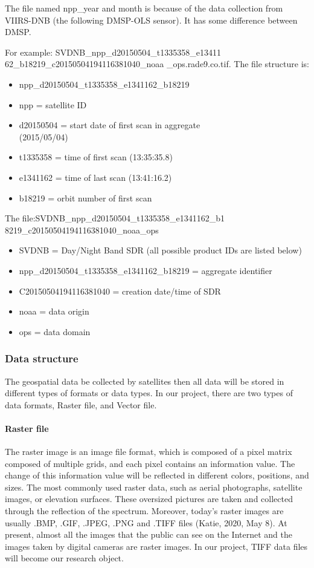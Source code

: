 \documentclass[conference]{IEEEtran}
\begin{document}
The file named npp\_year and month is because of the data collection from VIIRS-DNB (the following DMSP-OLS sensor). 
It has some difference between DMSP.

For example: SVDNB\_npp\_d20150504\_t1335358\_e13411
62\_b18219\_c20150504194116381040\_noaa
\_ops.rade9.co.tif. The file structure is:

\begin{itemize}
	\item npp\_d20150504\_t1335358\_e1341162\_b18219
	\item npp = satellite ID
	\item d20150504 = start date of first scan in aggregate \\
	(2015/05/04)
	\item t1335358 = time of first scan (13:35:35.8)
	\item e1341162 = time of last scan (13:41:16.2)
	\item b18219 = orbit number of first scan
\end{itemize} 

The file:SVDNB\_npp\_d20150504\_t1335358\_e1341162\_b1\\
8219\_c20150504194116381040\_noaa\_ops

\begin{itemize}
	\item SVDNB = Day/Night Band SDR (all possible product IDs are listed below)
	\item npp\_d20150504\_t1335358\_e1341162\_b18219 = aggregate identifier
	\item C20150504194116381040 = creation date/time of SDR
	\item noaa = data origin
	\item ops = data domain
\end{itemize}

\subsubsection{Data structure}

The geospatial data be collected by satellites then all data will be stored in different types of formats or data types. 
In our project, there are two types of data formats, Raster file, and Vector file.

\paragraph{Raster file} 

The raster image is an image file format, which is composed of a pixel matrix composed of multiple grids, and each pixel 
contains an information value. The change of this information value will be reflected in different colors, positions, and 
sizes. The most commonly used raster data, such as aerial photographs, satellite images, or elevation surfaces. These 
oversized pictures are taken and collected through the reflection of the spectrum. Moreover, today's raster images are 
usually .BMP, .GIF, .JPEG, .PNG and .TIFF files (Katie, 2020, May 8). At present, almost all the images that the public 
can see on the Internet and the images taken by digital cameras are raster images. In our project, TIFF data files will 
become our research object.
\end{document}
